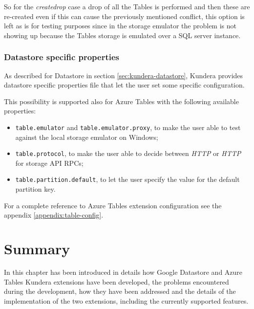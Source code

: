 \noindent So for the \textit{create\textunderscore drop} case a drop of all the Tables is performed and then these are re-created even if this can cause the previously mentioned conflict, this option is left as is for testing purposes since in the storage emulator the problem is not showing up because the Tables storage is emulated over a SQL server instance.

\subsubsection{Datastore specific properties}
As described for Datastore in section \ref{sec:kundera-datastore}, Kundera provides datastore specific properties file that let the user set some specific configuration.

\noindent This possibility is supported also for Azure Tables with the following available properties:
\begin{itemize}
\item \texttt{table.emulator} and \texttt{table.emulator.proxy}, to make the user able to test against the local storage emulator on Windows;
\item \texttt{table.protocol}, to make the user able to decide between \textit{HTTP} or \textit{HTTP} for storage API RPCs;
\item \texttt{table.partition.default}, to let the user specify the value for the default partition key.
\end{itemize} 

\newparagraph For a complete reference to Azure Tables extension configuration see the appendix \ref{appendix:table-config}.

\section{Summary}
In this chapter has been introduced in details how Google Datastore and Azure Tables Kundera extensions have been developed, the problems encountered during the development, how they have been addressed and the details of the implementation of the two extensions, including the currently supported features.

